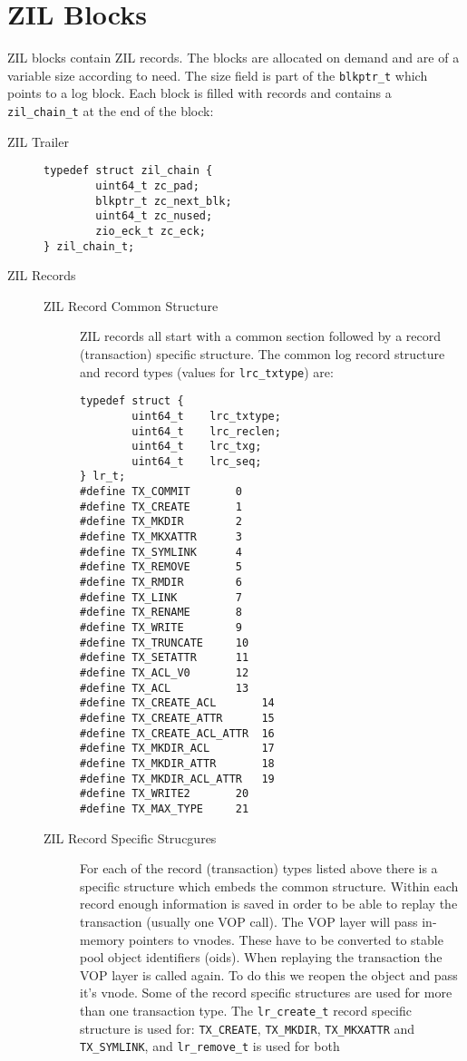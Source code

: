 \section{ZIL Blocks}

ZIL blocks contain ZIL records.
The blocks are allocated on demand and are of a variable size according to need.
The size field is part of the \lstinline{blkptr_t}
which points to a log block.
Each block is filled with records and contains a \lstinline{zil_chain_t} at the end of the block:

\begin{description}

\item[ZIL Trailer]
  \hfill
\begin{lstlisting}[style=c]
typedef struct zil_chain {
        uint64_t zc_pad;
        blkptr_t zc_next_blk;
        uint64_t zc_nused;
        zio_eck_t zc_eck;
} zil_chain_t;
\end{lstlisting}

\item[ZIL Records]
  \hfill\break
  \begin{description}
  \item[ZIL Record Common Structure]
    ZIL records all start with a common section
    followed by a record (transaction) specific structure.
    The common log record structure and record types (values for \lstinline{lrc_txtype}) are:
\begin{lstlisting}[style=c]
typedef struct {
        uint64_t	lrc_txtype;
        uint64_t	lrc_reclen;
        uint64_t	lrc_txg;
        uint64_t	lrc_seq;
} lr_t;
#define	TX_COMMIT		0
#define	TX_CREATE		1
#define	TX_MKDIR		2
#define	TX_MKXATTR		3
#define	TX_SYMLINK		4
#define	TX_REMOVE		5
#define	TX_RMDIR		6
#define	TX_LINK			7
#define	TX_RENAME		8
#define	TX_WRITE		9
#define	TX_TRUNCATE		10
#define	TX_SETATTR		11
#define	TX_ACL_V0		12
#define	TX_ACL			13
#define	TX_CREATE_ACL		14
#define	TX_CREATE_ATTR		15
#define	TX_CREATE_ACL_ATTR 	16
#define	TX_MKDIR_ACL		17
#define	TX_MKDIR_ATTR		18
#define	TX_MKDIR_ACL_ATTR	19
#define	TX_WRITE2		20
#define	TX_MAX_TYPE		21
\end{lstlisting}

  \item[ZIL Record Specific Strucgures]
    For each of the record (transaction) types listed above
    there is a specific structure
    which embeds the common structure.
    Within each record enough information is saved
    in order to be able to replay the transaction
    (usually one VOP call).
    The VOP layer will pass in-memory pointers to vnodes.
    These have to be converted to stable pool object identifiers (oids).
    When replaying the transaction the VOP layer is called again.
    To do this we reopen the object and pass it's vnode.
    Some of the record specific structures are used for more than one transaction type.
    The \lstinline{lr_create_t} record specific structure is used for:
    \lstinline{TX_CREATE}, \lstinline{TX_MKDIR}, \lstinline{TX_MKXATTR} and \lstinline{TX_SYMLINK},
    and \lstinline{lr_remove_t} is used for both


\end{description}
\end{description}
